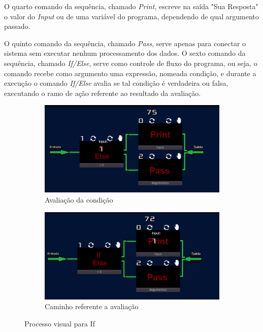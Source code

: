O quarto comando da sequência, chamado \textit{Print}, escreve na saída 
"Sua Resposta" o valor do \textit{Input} ou de uma variável do programa,
dependendo de qual argumento passado.

O quinto comando da sequência, chamado \textit{Pass}, serve apenas para conectar
o sistema sem executar nenhum processamento dos dados.
O sexto comando da sequência, chamado \textit{If/Else}, serve como controle de 
fluxo do programa, ou seja, o comando recebe como argumento uma expressão, 
nomeada condição, e durante a execução o comando \textit{If/Else} avalia se 
tal condição é verdadeira ou falsa, executando o ramo de ação referente ao 
resultado da avaliação.

\begin{figure}[H]
    \centering
    \begin{subfigure}{0.48\textwidth}
        \centering
        \includegraphics[width=1\textwidth]{../figuras/avaliacao_if.png}
        \caption{Avaliação da condição}
    \end{subfigure}
    \begin{subfigure}{0.48\textwidth}
        \centering
        \includegraphics[width=1\textwidth]{../figuras/caminho_if.png}
        \caption{Caminho referente a avaliação}
    \end{subfigure}  
    \caption{Processo visual para If}
\end{figure}

